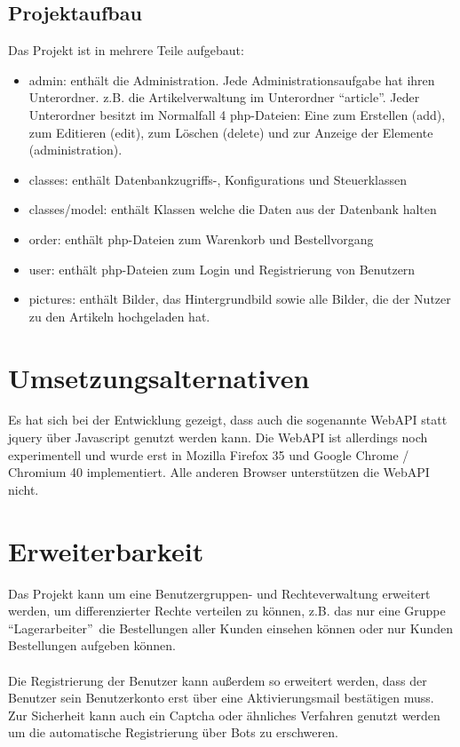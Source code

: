 \documentclass[a4paper,oneside,12pt]{scrartcl}
\begin{document}
\subsection{Projektaufbau}
Das Projekt ist in mehrere Teile aufgebaut:
\begin{itemize}
 \item admin: enthält die Administration. Jede Administrationsaufgabe hat ihren Unterordner.
 z.B. die Artikelverwaltung im Unterordner \textquotedblleft article\textquotedblright.
 Jeder Unterordner besitzt im Normalfall 4 php-Dateien: Eine zum Erstellen (add), zum Editieren (edit), zum Löschen (delete)
 und zur Anzeige der Elemente (administration).
 \item classes: enthält Datenbankzugriffs-, Konfigurations und Steuerklassen
 \item classes/model: enthält Klassen welche die Daten aus der Datenbank halten
 \item order: enthält php-Dateien zum Warenkorb und Bestellvorgang
 \item user: enthält php-Dateien zum Login und Registrierung von Benutzern
 \item pictures: enthält Bilder, das Hintergrundbild sowie alle Bilder, die der Nutzer zu den Artikeln hochgeladen hat.
\end{itemize}

\section{Umsetzungsalternativen}
Es hat sich bei der Entwicklung gezeigt, dass auch die sogenannte WebAPI statt jquery über Javascript genutzt werden kann.
Die WebAPI ist allerdings noch experimentell und wurde erst in Mozilla Firefox 35 und Google Chrome / Chromium 40 implementiert.
Alle anderen Browser unterstützen die WebAPI nicht.

\section{Erweiterbarkeit}
Das Projekt kann um eine Benutzergruppen- und Rechteverwaltung erweitert werden, um differenzierter 
Rechte verteilen zu können, z.B. das nur eine Gruppe \textquotedblleft Lagerarbeiter\textquotedblright\  die
Bestellungen aller Kunden einsehen können oder nur Kunden Bestellungen aufgeben können.\\
\\
Die Registrierung der Benutzer kann außerdem so erweitert werden, dass der Benutzer sein Benutzerkonto
erst über eine Aktivierungsmail bestätigen muss. Zur Sicherheit kann auch ein Captcha oder ähnliches Verfahren
genutzt werden um die automatische Registrierung über Bots zu erschweren.
\end{document}
